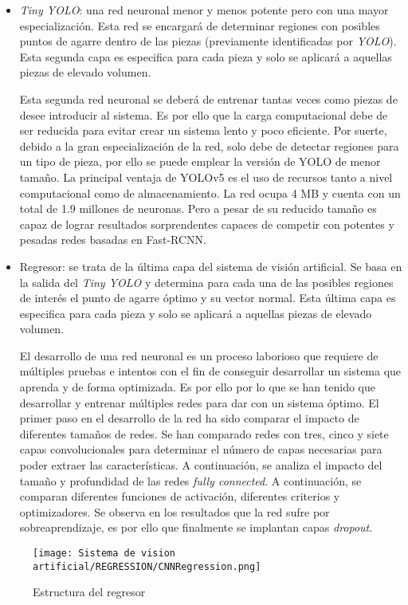 {\begin{itemize}
\item \textit{Tiny YOLO}: una red neuronal menor y menos potente pero con una mayor especialización. Esta red se encargará de determinar regiones con posibles puntos de agarre dentro de las piezas (previamente identificadas por \textit{YOLO}). Esta segunda capa es especifica para cada pieza y solo se aplicará a aquellas piezas de elevado volumen.

Esta segunda red neuronal se deberá de entrenar tantas veces como piezas de desee introducir al sistema. Es por ello que la carga computacional debe de ser reducida para evitar crear un sistema lento y poco eficiente. Por suerte, debido a la gran especialización de la red, solo debe de detectar regiones para un tipo de pieza, por ello se puede emplear la versión de YOLO de menor tamaño. La principal ventaja de YOLOv5 es el uso de recursos tanto a nivel computacional como de almacenamiento. La red ocupa 4 MB y cuenta con un total de 1.9 millones de neuronas. Pero a pesar de su reducido tamaño es capaz de lograr resultados sorprendentes capaces de competir con potentes y pesadas redes basadas en Fast-RCNN.

\item Regresor: se trata de la última capa del sistema de visión artificial. Se basa en la salida del \textit{Tiny YOLO} y determina para cada una de las posibles regiones de interés el punto de agarre óptimo y su vector normal. Esta última capa es especifica para cada pieza y solo se aplicará a aquellas piezas de elevado volumen.

El desarrollo de una red neuronal es un proceso laborioso que requiere de múltiples pruebas e intentos con el fin de conseguir desarrollar un sistema que aprenda y de forma optimizada. Es por ello por lo que se han tenido que desarrollar y entrenar múltiples redes para dar con un sistema óptimo. El primer paso en el desarrollo de la red ha sido comparar el impacto de diferentes tamaños de redes. Se han comparado redes con tres, cinco y siete capas convolucionales para determinar el número de capas necesarias para poder extraer las características. A continuación, se analiza el impacto del tamaño y profundidad de las redes \textit{fully connected}. A continuación, se comparan diferentes funciones de activación, diferentes criterios y optimizadores. Se observa en los resultados que la red sufre por sobreaprendizaje, es por ello que finalmente se implantan capas \textit{dropout}.
\end{itemize}

\begin{figure}[ht]
	\centering
	\texttt{[image: Sistema de vision artificial/REGRESSION/CNNRegression.png]}
	\caption{Estructura del regresor}
	\label{chap:Resumen fig:Estructura Regresor}
\end{figure}

}
